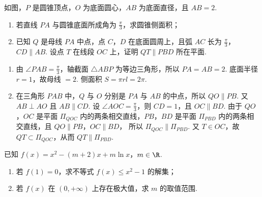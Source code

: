 \begin{problem}
如图，\(P\) 是圆锥顶点，\(O\) 为底面圆心，\(AB\) 为底面直径，且 \(AB=2\).
\begin{enumerate}
\item 若直线 \(PA\) 与圆锥底面所成角为 \(\frac{\pi}{3}\)，求圆锥侧面积；
\item 已知 \(Q\) 是母线 \(PA\) 中点，点 \(C\)，\(D\) 在底面圆周上，且弧 \(AC\) 长为 \(\frac{\pi}{3}\)，\(CD\parallel AB\). 设点 \(T\) 在线段 \(OC\) 上，证明 \(QT\parallel PBD\) 所在平面.
\end{enumerate}

\end{problem}

\begin{solution}
\begin{enumerate}
\item 由 \(\angle PAB=\frac{\pi}{3}\)，轴截面 \(\triangle ABP\) 为等边三角形，所以 \(PA=AB=2\). 底面半径 \(r=1\)，故母线 \(=2\). 侧面积 \(S=\pi r l=2\pi\).

\item 在三角形 \(PAB\) 中，\(Q\) 与 \(O\) 分别是 \(PA\) 与 \(AB\) 的中点，所以
\(QO\parallel PB\).
又 \(AB\perp AO\) 且 \(AB\parallel CD\). 设 \(\angle AOC=\frac{\pi}{3}\)，则 \(CD=1\)，且
\(OC\parallel BD\).
由于 \(QO\)，\(OC\) 是平面 \(\Pi_{QOC}\) 内的两条相交直线，\(PB\)，\(BD\) 是平面 \(\Pi_{PBD}\) 内的两条相交直线，且
\(QO\parallel PB\)，\(OC\parallel BD\)，
所以
\(\Pi_{QOC}\parallel\Pi_{PBD}\).
又 \(T\in OC\)，故 \(QT\subset\Pi_{QOC}\)，从而
\(QT\parallel\Pi_{PBD}\).
\end{enumerate}
\end{solution}

\begin{problem}
已知 \(f(x)=x^2-(m+2)x+m\ln x\)，\(m\in\R\).
\begin{enumerate}
\item 若 \(f(1)=0\)，求不等式 \(f(x)\le x^2-1\) 的解集；
\item 若 \(f(x)\) 在 \((0,+\infty)\) 上存在极大值，求 \(m\) 的取值范围.
\end{enumerate}
\end{problem}

